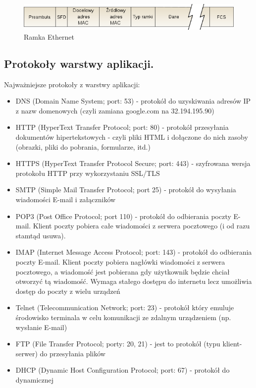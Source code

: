 \documentclass[a4paper,12pt,oneside]{book}
\begin{document}
				\begin{figure}[h!]
					\centering\includegraphics[scale=0.45]{ramka-ethernet.png}
					\caption{Ramka Ethernet}
				\end{figure}
			\newpage\subsection{Protokoły warstwy aplikacji.}
				Najważniejsze protokoły z warstwy aplikacji:
				\begin{itemize}
					\item DNS (Domain Name System; port: 53) - protokół do uzyskiwania adresów IP z nazw
					domenowych (czyli zamiana google.com na 32.194.195.90)
					\item HTTP (HyperText Transfer Protocol; port: 80) - protokół przesyłania dokumentów
					hipertekstowych - czyli pliki HTML i dołączone do nich zasoby (obrazki, pliki do
					pobrania, formularze, itd.)
					\item HTTPS (HyperText Transfer Protocol Secure; port: 443) - szyfrowana wersja
					protokołu HTTP przy wykorzystaniu SSL/TLS
					\item SMTP (Simple Mail Transfer Protocol; port 25) - protokół do wysyłania wiadomości
					E-mail i załączników
					\item POP3 (Post Office Protocol; port 110) - protokół do odbierania poczty E-mail. Klient
					poczty pobiera całe wiadomości z serwera pocztowego (i od razu stamtąd usuwa).
					\item IMAP (Internet Message Access Protocol; port: 143) - protokół do odbierania poczty
					E-mail. Klient poczty pobiera nagłówki wiadomości z serwera pocztowego, a
					wiadomość jest pobierana gdy użytkownik będzie chciał otworzyć tą wiadomość.
					Wymaga stałego dostępu do internetu lecz umożliwia dostęp do poczty z wielu
					urządzeń
					\item Telnet (Telecommunication Network; port: 23) - protokół który emuluje środowisko
					terminala w celu komunikacji ze zdalnym urządzeniem (np. wysłanie E-mail)
					\item FTP (File Transfer Protocol; porty: 20, 21) - jest to protokół (typu klient-serwer) do
					przesyłania plików
					\item DHCP (Dynamic Host Configuration Protocol; port: 67) - protokół do dynamicznej

\end{itemize}
\end{document}
